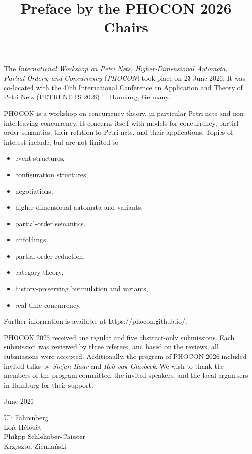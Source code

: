 \documentclass[a4paper,11pt]{article}
\begin{document}
\title{Preface by the PHOCON 2026 Chairs}
\date{}
\maketitle

The \emph{International Workshop on
  Petri Nets, Higher-Dimensional Automata, Partial Orders, and Concurrency}
(\emph{PHOCON})
took place on 23 June 2026.
It was co-located with the 47th International Conference on Application and Theory of Petri Nets
(PETRI NETS 2026)
in Hamburg, Germany.

PHOCON is a workshop on concurrency theory, in particular Petri nets and non-interleaving concurrency. It concerns itself with models for concurrency, partial-order semantics, their relation to Petri nets, and their applications. Topics of interest include, but are not limited to
\begin{itemize}
\item event structures,
\item configuration structures,
\item negotiations,
\item higher-dimensional automata and variants,
\item partial-order semantics,
\item unfoldings,
\item partial-order reduction,
\item category theory,
\item history-preserving bisimulation and variants,
\item real-time concurrency.
\end{itemize}
Further information is available at \url{https://phocon.github.io/}.

PHOCON 2026 received one regular and five abstract-only submissions.
Each submission was reviewed by three referees, and based on the reviews, all submissions were accepted.
Additionally, the program of PHOCON 2026 included invited talks by \emph{Stefan Haar} and \emph{Rob van Glabbeek}.
We wish to thank the members of the program committee, the invited speakers,
and the local organisers in Hamburg for their support.

\bigskip\noindent
June 2026
\hfill
\begin{minipage}[t]{.5\linewidth}
  \flushright
  Uli Fahrenberg \\
  Loïc Hélouët \\
  Philipp Schlehuber-Caissier \\
  Krzysztof Ziemiański
\end{minipage}
\end{document}
